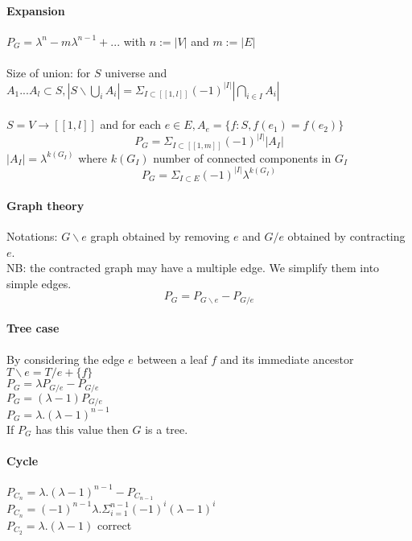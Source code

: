 \documentclass[12pt]{article}
\begin{document}
\paragraph{Expansion\\}
$P_G = \lambda^n - m \lambda^{n-1} + ...$ with $n := |V|$ and $m := |E|$\\\\

Size of union: for $S$ universe and $A_1 ... A_l \subset S, |S \backslash \bigcup_i A_i| = \Sigma_{I \subset [[1,l]]}(-1)^{|I|}|\bigcap_{i \in I} A_i|$\\\\

$S = V \rightarrow [[1,l]]$ and for each $e \in E, A_e = \{ f : S, f (e_1) = f (e_2) \}$
\[ P_G = \Sigma_{I \subset [[1,m]]} (-1)^{|I|} |A_I| \]
$|A_I| = \lambda^{k(G_I)}$ where $k(G_I)$ number of connected components in $G_I$\\
\[ P_G = \Sigma_{I \subset E} (-1)^{|I|} \lambda^{k(G_I)} \]

\paragraph{Graph theory\\}
Notations: $G \backslash e$ graph obtained by removing $e$ and $G / e$ obtained by contracting $e$.\\
NB: the contracted graph may have a multiple edge. We simplify them into simple edges.\\

\[ P_G = P_{G \backslash e} - P_{G/e} \]

\paragraph{Tree case\\}
By considering the edge $e$ between a leaf $f$ and its immediate ancestor\\
$T \backslash e = T/e + \{f\}$\\
$P_G = \lambda P_{G/e} - P_{G/e}$\\
$P_G = (\lambda - 1) P_{G/e}$\\
$P_G = \lambda . (\lambda - 1)^{n-1}$\\
If $P_G$ has this value then $G$ is a tree.\\

\paragraph{Cycle\\}
$P_{C_n} = \lambda.(\lambda - 1)^{n-1} - P_{C_{n-1}}$\\
$P_{C_n} = (-1)^{n-1} \lambda . \Sigma_{i=1}^{n-1} (-1)^i (\lambda - 1)^i$\\
$P_{C_2} = \lambda . (\lambda - 1)$ correct\\\\
\end{document}
